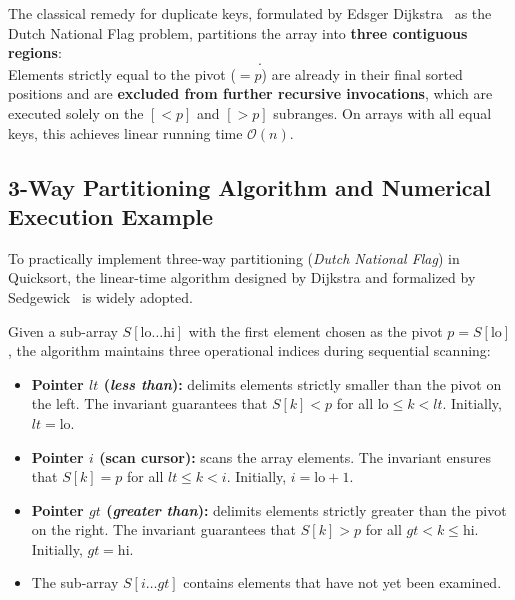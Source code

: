 \begin{definition}
The classical remedy for duplicate keys, formulated by Edsger Dijkstra~\cite{dijkstra1976} as the Dutch National Flag problem, partitions the array into \textbf{three contiguous regions}:
\begin{equation}
  [\, < p \quad \mid \quad = p \quad \mid \quad > p \,].
\end{equation}
Elements strictly equal to the pivot ($= p$) are already in their final sorted positions and are \textbf{excluded from further recursive invocations}, which are executed solely on the $[< p]$ and $[> p]$ subranges. On arrays with all equal keys, this achieves linear running time $\mathcal{O}(n)$.
\end{definition}

\subsection{3-Way Partitioning Algorithm and Numerical Execution Example}
\label{subsec:3way-quicksort-example}

To practically implement three-way partitioning (\textit{Dutch National Flag}) in Quicksort, the linear-time algorithm designed by Dijkstra and formalized by Sedgewick~\cite{sedgewick1978} is widely adopted.

Given a sub-array $S[\text{lo} \dots \text{hi}]$ with the first element chosen as the pivot $p = S[\text{lo}]$, the algorithm maintains three operational indices during sequential scanning:
\begin{itemize}
  \item \textbf{Pointer $lt$ (\textit{less than}):} delimits elements strictly smaller than the pivot on the left. The invariant guarantees that $S[k] < p$ for all $\text{lo} \le k < lt$. Initially, $lt = \text{lo}$.
  \item \textbf{Pointer $i$ (scan cursor):} scans the array elements. The invariant ensures that $S[k] = p$ for all $lt \le k < i$. Initially, $i = \text{lo} + 1$.
  \item \textbf{Pointer $gt$ (\textit{greater than}):} delimits elements strictly greater than the pivot on the right. The invariant guarantees that $S[k] > p$ for all $gt < k \le \text{hi}$. Initially, $gt = \text{hi}$.
  \item The sub-array $S[i \dots gt]$ contains elements that have not yet been examined.
\end{itemize}

